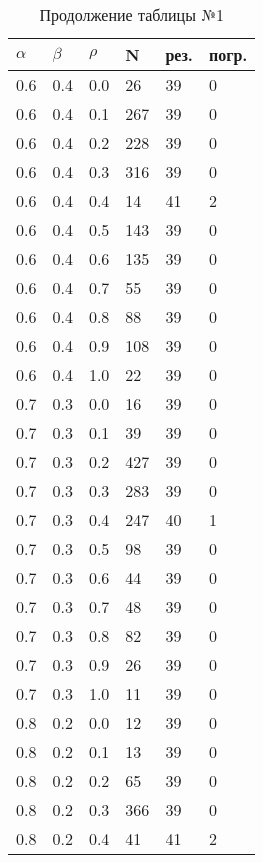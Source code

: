 \begin{table}[!htb]
	\begin{minipage}{.45\linewidth}
		\caption*{Продолжение таблицы №1\newline}
		\centering
		\begin{tabular}{||p{}p{}p{}p{}p{}p{}||}
			\hline
			$\alpha$ & $\beta$ & $\rho$ & N & рез. & погр. \\ \hline\hline
			0.6 & 0.4 & 0.0 & 26 & 39 & 0 \\ 
			0.6 & 0.4 & 0.1 & 267 & 39 & 0 \\ 
			0.6 & 0.4 & 0.2 & 228 & 39 & 0 \\ 
			0.6 & 0.4 & 0.3 & 316 & 39 & 0 \\ 
			0.6 & 0.4 & 0.4 & 14 & 41 & 2 \\ 
			0.6 & 0.4 & 0.5 & 143 & 39 & 0 \\ 
			0.6 & 0.4 & 0.6 & 135 & 39 & 0 \\ 
			0.6 & 0.4 & 0.7 & 55 & 39 & 0 \\ 
			0.6 & 0.4 & 0.8 & 88 & 39 & 0 \\ 
			0.6 & 0.4 & 0.9 & 108 & 39 & 0 \\ 
			0.6 & 0.4 & 1.0 & 22 & 39 & 0  \\ \hline
			0.7 & 0.3 & 0.0 & 16 & 39 & 0 \\ 
			0.7 & 0.3 & 0.1 & 39 & 39 & 0 \\ 
			0.7 & 0.3 & 0.2 & 427 & 39 & 0 \\ 
			0.7 & 0.3 & 0.3 & 283 & 39 & 0 \\ 
			0.7 & 0.3 & 0.4 & 247 & 40 & 1 \\ 
			0.7 & 0.3 & 0.5 & 98 & 39 & 0 \\ 
			0.7 & 0.3 & 0.6 & 44 & 39 & 0 \\ 
			0.7 & 0.3 & 0.7 & 48 & 39 & 0 \\ 
			0.7 & 0.3 & 0.8 & 82 & 39 & 0 \\ 
			0.7 & 0.3 & 0.9 & 26 & 39 & 0 \\ 
			0.7 & 0.3 & 1.0 & 11 & 39 & 0  \\ \hline
			0.8 & 0.2 & 0.0 & 12 & 39 & 0 \\ 
			0.8 & 0.2 & 0.1 & 13 & 39 & 0 \\ 
			0.8 & 0.2 & 0.2 & 65 & 39 & 0 \\ 
			0.8 & 0.2 & 0.3 & 366 & 39 & 0 \\ 
			0.8 & 0.2 & 0.4 & 41 & 41 & 2 \\ 

\end{tabular}
\end{minipage}
\end{table}
